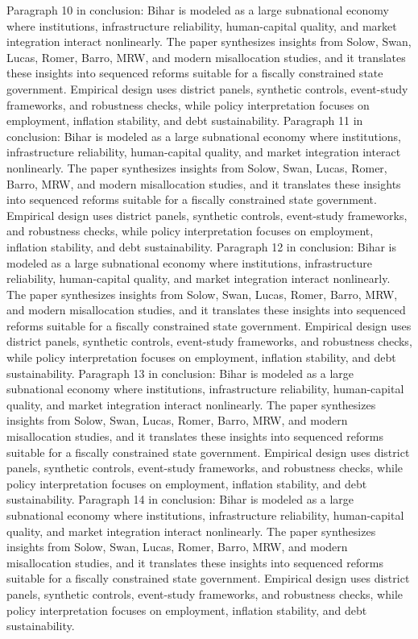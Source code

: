 \documentclass[preprint,12pt]{elsarticle}
\begin{document}
Paragraph 10 in conclusion: Bihar is modeled as a large subnational economy where institutions, infrastructure reliability, human-capital quality, and market integration interact nonlinearly. The paper synthesizes insights from Solow, Swan, Lucas, Romer, Barro, MRW, and modern misallocation studies, and it translates these insights into sequenced reforms suitable for a fiscally constrained state government. Empirical design uses district panels, synthetic controls, event-study frameworks, and robustness checks, while policy interpretation focuses on employment, inflation stability, and debt sustainability.
Paragraph 11 in conclusion: Bihar is modeled as a large subnational economy where institutions, infrastructure reliability, human-capital quality, and market integration interact nonlinearly. The paper synthesizes insights from Solow, Swan, Lucas, Romer, Barro, MRW, and modern misallocation studies, and it translates these insights into sequenced reforms suitable for a fiscally constrained state government. Empirical design uses district panels, synthetic controls, event-study frameworks, and robustness checks, while policy interpretation focuses on employment, inflation stability, and debt sustainability.
Paragraph 12 in conclusion: Bihar is modeled as a large subnational economy where institutions, infrastructure reliability, human-capital quality, and market integration interact nonlinearly. The paper synthesizes insights from Solow, Swan, Lucas, Romer, Barro, MRW, and modern misallocation studies, and it translates these insights into sequenced reforms suitable for a fiscally constrained state government. Empirical design uses district panels, synthetic controls, event-study frameworks, and robustness checks, while policy interpretation focuses on employment, inflation stability, and debt sustainability.
Paragraph 13 in conclusion: Bihar is modeled as a large subnational economy where institutions, infrastructure reliability, human-capital quality, and market integration interact nonlinearly. The paper synthesizes insights from Solow, Swan, Lucas, Romer, Barro, MRW, and modern misallocation studies, and it translates these insights into sequenced reforms suitable for a fiscally constrained state government. Empirical design uses district panels, synthetic controls, event-study frameworks, and robustness checks, while policy interpretation focuses on employment, inflation stability, and debt sustainability.
Paragraph 14 in conclusion: Bihar is modeled as a large subnational economy where institutions, infrastructure reliability, human-capital quality, and market integration interact nonlinearly. The paper synthesizes insights from Solow, Swan, Lucas, Romer, Barro, MRW, and modern misallocation studies, and it translates these insights into sequenced reforms suitable for a fiscally constrained state government. Empirical design uses district panels, synthetic controls, event-study frameworks, and robustness checks, while policy interpretation focuses on employment, inflation stability, and debt sustainability.
\end{document}
